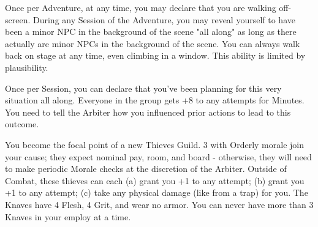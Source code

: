 {\begin{multicols*}{2}
{    \item {} Once per Adventure, at any time, you may declare that you are walking off-screen. During any Session of the Adventure, you may reveal yourself to have been a minor NPC in the background of the scene "all along" as long as there actually are minor NPCs in the background of the scene. You can always walk back on stage at any time, even climbing in a window. This ability is limited by plausibility.

    \item  {} Once per Session, you can declare that you’ve been planning for this very situation all along. Everyone in the group gets +8 to any \RO attempts for Minutes.  You need to tell the Arbiter how you influenced prior actions to lead to this outcome.

    \item  {} You become the focal point of a new Thieves Guild.  3  with Orderly morale join your cause; they expect nominal pay, room, and board - otherwise, they will need to make periodic Morale checks at the discretion of the Arbiter. Outside of Combat, these thieves can each (a) grant you +1 to any \RO attempt; (b) grant you +1 to any \KNAVE attempt; (c) take any physical damage (like from a trap) for you.  The Knaves have 4 Flesh, 4 Grit, and wear no armor.  You can never have more than 3 Knaves in your employ at a time.
  }




\end{multicols*}}
